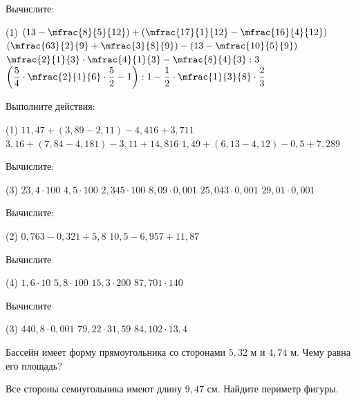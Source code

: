 \begin{class}[number=8]
	\begin{listofex}
		\item Вычислите: 
		\begin{tasks}(1)
			\task \( \left( 13-\mfrac{8}{5}{12} \right)+\left( \mfrac{17}{1}{12}-\mfrac{16}{4}{12} \right) \)
			\task \( \left( \mfrac{63}{2}{9}+\mfrac{3}{8}{9} \right)-\left( 13-\mfrac{10}{5}{9} \right) \)
			\task \( \mfrac{2}{1}{3}\cdot\mfrac{4}{1}{3}-\mfrac{8}{4}{3}:3 \)
			\task \( \left( \dfrac{5}{4}\cdot\mfrac{2}{1}{6}\cdot\dfrac{5}{2}-1 \right):1-\dfrac{1}{2}\cdot\mfrac{1}{3}{8}\cdot\dfrac{2}{3} \)
		\end{tasks}
		\item Выполните действия:
		\begin{tasks}(1)
			\task \( 11,47+(3,89-2,11)-4,416+3,711 \)
			\task \( 3,16+(7,84-4,181)-3,11+14,816 \)
			\task \( 1,49+(6,13-4,12)-0,5+7,289 \)
		\end{tasks}
		\item Вычислите:
		\begin{tasks}(3)
			\task \( 23,4\cdot100 \)
			\task\( 4,5 \cdot100 \)
			\task \( 2,345\cdot100 \)
			\task\( 8,09\cdot0,001 \) 
			\task\( 25,043 \cdot0,001  \)
			\task\( 29,01\cdot0,001   \)
		\end{tasks}
		
		
	\end{listofex}
\end{class}

\begin{homework}[number=4]
	\begin{listofex}
		\item Вычислите:
		\begin{tasks}(2)
			\task \( 0,763-0,321+5,8 \)
			\task \( 10,5-6,957+11,87 \)
		\end{tasks}
		\item Вычислите 
		\begin{tasks}(4)
			\task \( 1,6\cdot10 \)
			\task \( 5,8\cdot100 \)
			\task \( 15,3\cdot200 \)
			\task \( 87,701\cdot 140 \)
		\end{tasks}
		\item Вычислите 
		\begin{tasks}(3)
			\task \( 440,8\cdot0,001 \)
			\task \( 79,22\cdot31,59 \)
			\task \( 84,102\cdot13,4 \)
		\end{tasks}
		\item Бассейн имеет форму прямоугольника со сторонами \( 5,32 \) м и \( 4,74 \) м. Чему равна его площадь?
		\item Все стороны семиугольника имеют длину \( 9,47 \) см. Найдите периметр фигуры.
	\end{listofex}
\end{homework}

